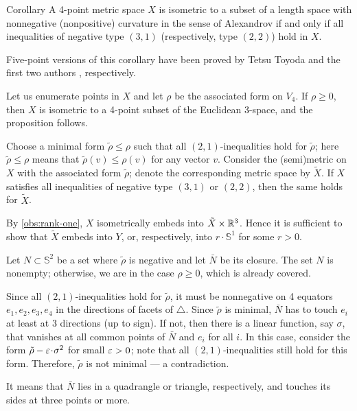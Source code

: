 \documentclass[a4paper,10pt]{article}
\begin{document}
\begin{thm}{Corollary}\label{cor:Four-point arrays}
A 4-point metric space $X$ is isometric to a subset of a length space with nonnegative (nonpositive) curvature in the sense of Alexandrov if and only if all inequalities of negative type $(3, 1)$ (respectively, type $(2, 2)$) hold in $X$.
\end{thm}

Five-point versions of this corollary have been proved by Tetsu Toyoda \cite{toyoda,lebedeva-petrunin2021} and the first two authors \cite{lebedeva-petrunin-2024}, respectively.

Let us enumerate points in $X$ and let $\rho$ be the associated form on $V_4$.
If $\rho\ge 0$, then $X$ is isometric to a 4-point subset of the Euclidean 3-space,
and the proposition follows.

Choose a minimal form $\tilde\rho\le \rho$ such that all $(2,1)$-inequalities hold for $\tilde\rho$;
here $\tilde\rho\le \rho$ means that $\tilde\rho(v)\le \rho(v)$ for any vector $v$.
Consider the (semi)metric on $X$ with the associated form $\tilde\rho$;
denote the corresponding metric space by $\tilde X$.
If $X$ satisfies all inequalities of negative type $(3, 1)$ or $(2,2)$, then the same holds for $\tilde X$.

By \ref{obs:rank-one}, $X$ isometrically embeds into $\tilde X\times \mathbb{R}^3$.
Hence it is sufficient to show that $\tilde X$ embeds into $Y$, or, respectively, into $r\cdot \mathbb{S}^1$ for some $r>0$.

Let $N\subset \mathbb{S}^2$ be a set where $\tilde\rho$ is negative and let $\bar N$ be its closure.
The set $N$ is nonempty; otherwise, we are in the case $\rho\ge 0$, which is already covered.

Since all $(2,1)$-inequalities hold for $\tilde\rho$,
it must be nonnegative on 4 equators $e_1,e_2,e_3,e_4$ in the directions of facets of $\triangle$.
Since $\tilde\rho$ is minimal, $\bar N$ has to touch $e_i$ at least at 3 directions (up to sign). 
If not, then there is a linear function, say $\sigma$, that vanishes at all common points of $\bar N$ and $e_i$ for all $i$.
In this case, consider the form $\tilde\rho-\eps\cdot \sigma^2$ for small $\varepsilon>0$;
note that all $(2,1)$-inequalities still hold for this form.
Therefore, $\tilde\rho$ is not minimal --- a contradiction.

It means that $\bar N$ lies in a quadrangle or triangle, respectively, and touches its sides at three points or more.
\end{document}
